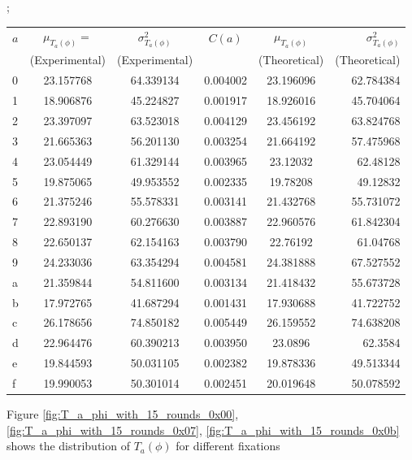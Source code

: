 \begin{center}
\begin{scriptsize}
;
\begin{tabular}{l*{4}{c}r} \label{table:T_a_phi_fixed_a_variable_fixation}
$a$ & $\mu_{T_{a}(\phi)}=$ &  $\sigma^2_{T_{a}(\phi)}$ & $C\left(a\right)$ & $\mu_{T_{a}(\phi)}$ & $\sigma^2_{T_{a}(\phi)}$ \\
 & (Experimental) &  (Experimental) &  & (Theoretical) & (Theoretical) \\
\hline
0 & 23.157768 & 64.339134 & 0.004002 & 23.196096 & 62.784384\\
1 & 18.906876 & 45.224827 & 0.001917 & 18.926016 & 45.704064\\
2 & 23.397097 & 63.523018 & 0.004129 & 23.456192 & 63.824768\\
3 & 21.665363 & 56.201130 & 0.003254 & 21.664192 & 57.475968\\
4 & 23.054449 & 61.329144 & 0.003965 & 23.12032 & 62.48128\\
5 & 19.875065 & 49.953552 & 0.002335 & 19.78208 & 49.12832\\
6 & 21.375246 & 55.578331 & 0.003141 & 21.432768 & 55.731072\\
7 & 22.893190 & 60.276630 & 0.003887 & 22.960576 & 61.842304\\
8 & 22.650137 & 62.154163 & 0.003790 & 22.76192 & 61.04768\\
9 & 24.233036 & 63.354294 & 0.004581 & 24.381888 & 67.527552\\
a & 21.359844 & 54.811600 & 0.003134 & 21.418432 & 55.673728\\
b & 17.972765 & 41.687294 & 0.001431 & 17.930688 & 41.722752\\
c & 26.178656 & 74.850182 & 0.005449 & 26.159552 & 74.638208\\
d & 22.964476 & 60.390213 & 0.003950 & 23.0896 & 62.3584\\
e & 19.844593 & 50.031105 & 0.002382 & 19.878336 & 49.513344\\
f & 19.990053 & 50.301014 & 0.002451 & 20.019648 & 50.078592\\
\end{tabular}
\end{scriptsize}
\end{center} \par \noindent Figure \ref{fig:T_a_phi_with_15_rounds_0x00},\ref{fig:T_a_phi_with_15_rounds_0x07}, \ref{fig:T_a_phi_with_15_rounds_0x0b}  shows the distribution of $T_a(\phi)$ for different fixations
